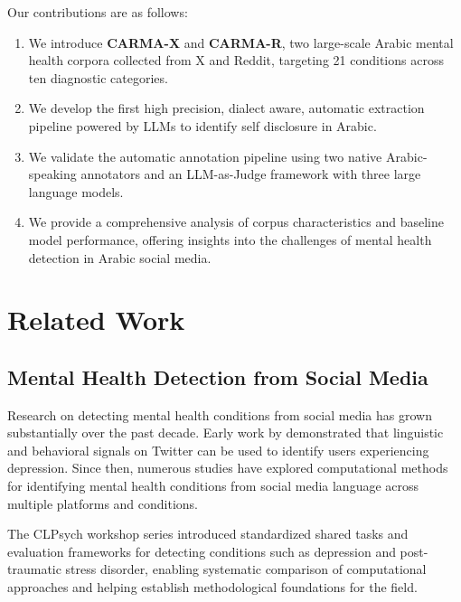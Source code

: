 \documentclass[11pt]{article}
\begin{document}
Our contributions are as follows:
\begin{enumerate}
    \item We introduce \textbf{CARMA-X} and \textbf{CARMA-R}, two large-scale
    Arabic mental health corpora collected from X and Reddit, targeting 21
    conditions across ten diagnostic categories. 

    \item We develop the first high precision, dialect aware, automatic extraction pipeline powered by LLMs to identify self disclosure in Arabic.

    \item We validate the automatic annotation pipeline using two native Arabic-speaking
    annotators and an LLM-as-Judge framework with three large language
    models.

    \item We provide a comprehensive analysis of corpus characteristics and
    baseline model performance, offering insights into the challenges of mental
    health detection in Arabic social media.
    
\end{enumerate}



\section{Related Work}
\label{sec:related_work}

\subsection{Mental Health Detection from Social Media}
\label{subsec:related_social_media}

Research on detecting mental health conditions from social media has grown
substantially over the past decade. Early work by \citet{de2013predicting}
demonstrated that linguistic and behavioral signals on Twitter can be used to
identify users experiencing depression. Since then, numerous studies have explored
computational methods for identifying mental health conditions from social media
language across multiple platforms and conditions.

The CLPsych workshop series \cite{coppersmith2015clpsych} introduced standardized
shared tasks and evaluation frameworks for detecting conditions such as depression
and post-traumatic stress disorder, enabling systematic comparison of computational
approaches and helping establish methodological foundations for the field.
\end{document}
